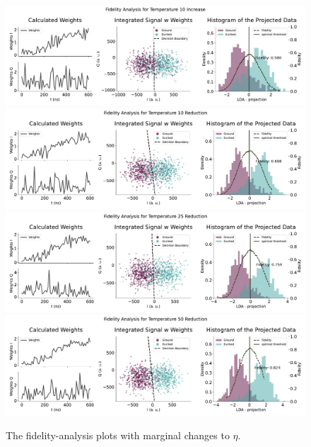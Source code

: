 \begin{figure}[h]
    \centering
    \includegraphics{Simulations/budgets/figures/temperature_10_increase_sme.pdf}
    \includegraphics{Simulations/budgets/figures/temperature_10_reduction_sme.pdf}
    \includegraphics{Simulations/budgets/figures/temperature_25_reduction_sme.pdf}
    \includegraphics{Simulations/budgets/figures/temperature_50_reduction_sme.pdf}
    \caption{The fidelity-analysis plots with marginal changes to $\eta$.}
    \label{fig:enter-label}
\end{figure}

    